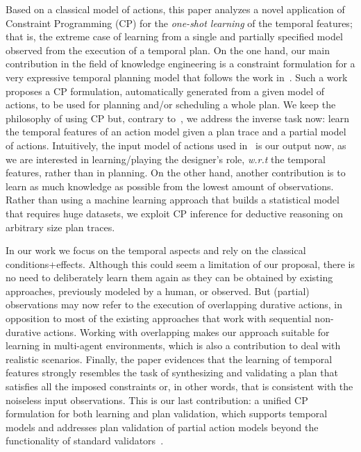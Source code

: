 \documentclass[10pt,journal,compsoc]{IEEEtran}
\begin{document}
Based on a classical model of actions, this paper analyzes a novel application of Constraint Programming (CP) for the {\em one-shot learning} of the temporal features; that is, the extreme case of learning from a single and partially specified model observed from the execution of a temporal plan. On the one hand, our main contribution in the field of knowledge engineering is a constraint formulation for a very expressive temporal planning model that follows the work in~\cite{garrido2009constraint}. Such a work proposes a CP formulation, automatically generated from a given model of actions, to be used for planning and/or scheduling a whole plan.
We keep the philosophy of using CP but, contrary to~\cite{garrido2009constraint}, we address the inverse task now: learn the temporal features of an action model given a plan trace and a partial model of actions. Intuitively, the input model of actions used in~\cite{garrido2009constraint} is our output now, as we are interested in learning/playing the designer's role, \emph{w.r.t} the temporal features, rather than in planning. 
On the other hand, another contribution is to learn as much knowledge as possible from the lowest amount of observations.
Rather than using a machine learning approach that builds a statistical model that requires huge datasets, we exploit CP inference for deductive reasoning on arbitrary size plan traces.


In our work we focus on the temporal aspects and rely on the classical conditions+effects. Although this could seem a limitation of our proposal, there is no need to deliberately learn them again as they can be obtained by existing approaches, previously modeled by a human, or observed. But (partial) observations may now refer to the execution of overlapping durative actions, in opposition to most of the existing approaches that work with sequential non-durative actions. Working with overlapping makes our approach suitable for learning in multi-agent environments, which is also a contribution to deal with realistic scenarios. Finally, the paper evidences that the learning of temporal features strongly resembles the task of synthesizing and validating a plan that satisfies all the imposed constraints or, in other words, that is consistent with the noiseless input observations. This is our last contribution: a unified CP formulation for both learning and plan validation, which supports temporal models and addresses plan validation of partial action models beyond the functionality of standard validators~\cite{howey2004val}.
\end{document}
